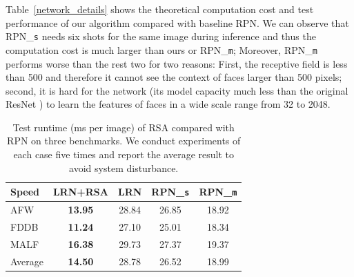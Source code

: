 \documentclass[10pt,twocolumn,letterpaper]{article}
\begin{document}
Table~\ref{network_details} shows the theoretical computation cost and test performance of our algorithm compared with baseline RPN. 
We can observe that
RPN\_\texttt{s} needs six shots for the same image during inference and thus the computation cost is much larger than ours or RPN\_\texttt{m};
%
%
Moreover, RPN\_\texttt{m} performs worse than the rest two for two reasons:
%
%
First,
the receptive field is less than 500 and therefore it cannot see the context of faces larger than 500 pixels; second, it is hard for the %
network (its model capacity much less than the original ResNet \cite{resNet}) to learn the features of faces in a wide scale range from 32 to 2048.
% 
%


\begin{table}[t]
	\caption{Test runtime (ms per image) of RSA compared with RPN on three benchmarks. We conduct experiments of each case five times and report the average result
		to avoid system disturbance. }
	\vspace{-.2cm}
\begin{center}
	\footnotesize{
\begin{tabular}{ l|c|c c c}
\toprule
 Speed  & LRN+RSA & LRN & RPN\_\texttt{s} & RPN\_\texttt{m} \\
\midrule
AFW & \textbf{13.95} & 28.84 & 26.85 & 18.92 \\
FDDB & \textbf{11.24} & 27.10 & 25.01 & 18.34 \\
MALF & \textbf{16.38} & 29.73 & 27.37  & 19.37 \\
\midrule
Average & \textbf{14.50} & 28.78 & 26.52 & 18.99 \\
\bottomrule
\end{tabular}
}
\end{center}
\vspace{-.4cm}
\label{testing_time}
\end{table}
\end{document}

